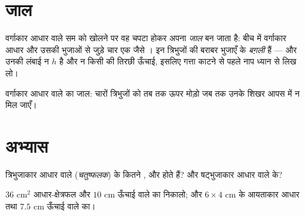 \section{जाल}

\begin{example}[पिरामिड का जाल]\label{ex:g8:solids:net}
वर्गाकार आधार वाले सम  को खोलने पर वह चपटा होकर अपना
\emph{जाल} बन जाता है: बीच में वर्गाकार आधार और उसकी भुजाओं से जुड़े
चार एक जैसे । इन त्रिभुजों की बराबर भुजाएँ 
के \emph{बग़ली } हैं --- और उनकी लंबाई न $h$ है और न किसी 
की तिरछी ऊँचाई, इसलिए गत्ता काटने से पहले नाप ध्यान से लिख लो।
\end{example}

\begin{omfigure}

{\small वर्गाकार आधार वाले  का जाल: चारों त्रिभुजों को तब तक
ऊपर मोड़ो जब तक उनके शिखर आपस में न मिल जाएँ।}
\end{omfigure}

\section{अभ्यास}

\begin{exercise}[$\star$]\label{exo:g8:solids:1}
त्रिभुजाकार आधार वाले  (\emph{चतुष्फलक}) के कितने ,
 और  होते हैं? और षट्भुजाकार आधार वाले के?
\end{exercise}

\begin{exercise}[$\star$]\label{exo:g8:solids:2}
$36$ cm$^2$ आधार-क्षेत्रफल और $10$ cm ऊँचाई वाले  का 
निकालो; और $6 \times 4$ cm के आयताकार आधार तथा $7.5$ cm ऊँचाई वाले
 का।
\end{exercise}

